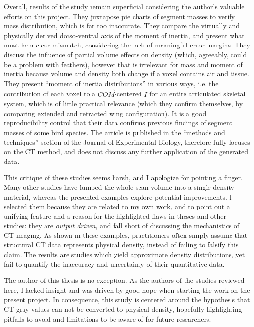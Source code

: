 Overall, results of the \citet{Durston2022} study remain superficial considering the author's valuable efforts on this project.
They juxtapose pie charts of segment masses to verify mass distribution, which is far too inaccurate.
They compare the virtually and physically derived dorso-ventral axis of the moment of inertia, and present what must be a clear mismatch, considering the lack of meaningful error margins.
They discuss the influence of partial volume effects on density (which, agreeably, could be a problem with feathers), however that is irrelevant for mass and moment of inertia because volume and density both change if a voxel contains air and tissue.
They present ``moment of inertia distributions'' in various ways, i.e. the contribution of each voxel to a \(\vec{COM}\)-centered \(I\) for an entire articulated skeletal system, which is of little practical relevance (which they confirm themselves, by comparing extended and retracted wing configuration).
It is a good reproducibility control that their data confirms previous findings of segment masses of some bird species.
The article is published in the ``methods and techniques'' section of the Journal of Experimental Biology, therefore fully focuses on the CT method, and does not discuss any further application of the generated data.


\medskip
This critique of these studies seems harsh, and I apologize for pointing a finger.
Many other studies have lumped the whole scan volume into a single density material, whereas the presented examples explore potential improvements.
I selected them because they are related to my own work, and to point out a unifying feature and a reason for the highlighted flaws in theses and other studies: they are \emph{output driven}, and fall short of discussing the mechanistics of CT imaging.
As shown in these examples, practitioners often simply assume that structural CT data represents physical density, instead of failing to falsify this claim.
The results are studies which yield approximate density distributions, yet fail to quantify the inaccuracy and uncertainty of their quantitative data.


The author of this thesis is no exception.
As the authors of the studies reviewed here, I lacked insight and was driven by good hope when starting the work on the present project.
In consequence, this study is centered around the hypothesis that CT gray values can not be converted to physical density, hopefully highlighting pitfalls to avoid and limitations to be aware of for future researchers.
